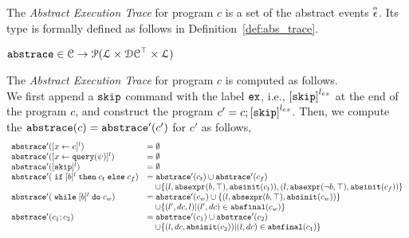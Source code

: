  The \emph{Abstract Execution Trace} for program $c$ is a set of the abstract events $\stackrel{\scriptscriptstyle{\alpha}}{\mathtt{\epsilon}{}}$.
 Its type is formally defined as follows in Definition~\ref{def:abs_trace}.
 \begin{defn}
 \label{def:abs_trace}
  $\mathtt{abs}{\mathtt{trace}} \in \mathcal{C} \to \mathcal{P}( \mathcal{L} \times \mathcal{DC}^{\top} \times \mathcal{L} )$
  \end{defn}
 The \emph{Abstract Execution Trace} for program $c$ is computed as follows.
 \\
 We first append a $\mathtt{skip}$ command with 
the label $\mathtt{ex}$, i.e., $\clabel{\eskip}^{l_{ex}}$ at the end of the program $c$, and construct 
the program $c' = c;\clabel{\eskip}^{l_{ex}}$.
Then, we compute the $\mathtt{abs}{\mathtt{trace}}(c) = \mathtt{abs}{\mathtt{trace}}'(c')$ for $c'$ as follows,
 {\footnotesize
 \[
   \begin{array}{ll}
      \absflow'(\clabel{\assign{x}{\expr}}{}^l)  & = \emptyset  \\
      \absflow'(\clabel{\assign{x}{\query(\qexpr)}}{}^l)  & = \emptyset  \\
      \absflow'([\eskip]^{l})  & = \emptyset \\
      \absflow'(\eif [b]^l \ethen c_t \eelse c_f)  & =  \absflow'(c_t) \cup \absflow'(c_f)
        \\ & \quad 
        \cup \{(l, \absexpr(\bexpr, \top),  \absinit(c_t) ) ,  (l, \absexpr(\neg\bexpr, \top), \absinit(c_f)) \} \\
       \absflow'(\ewhile [b]^l \edo c_w)  & =  \absflow'(c_w) \cup \{(l, \absexpr(\bexpr, \top), \absinit(c_w)) \} 
       \\ & \quad 
       \cup \{(l', dc, l)| (l', dc) \in \absfinal(c_w) \} \\
       \absflow'(c_1 ; c_2)  & = \absflow'(c_1) \cup  \absflow'(c_2) 
       \\ & \quad 
       \cup \{ (l, dc, \absinit(c_2)) | (l, dc) \in \absfinal(c_1) \} \\
   \end{array}
   \]
   }

